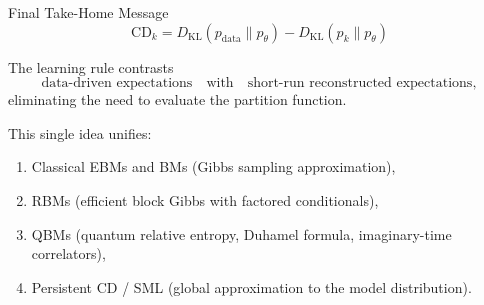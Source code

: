\documentclass[aspectratio=169]{beamer}
\newcommand{\pmodel}{p_{\theta}}
\newcommand{\DKL}{D_{\mathrm{KL}}}
\begin{document}
\begin{frame}{Final Take-Home Message}
\[
  \boxed{
    \mathrm{CD}_k
    = \DKL(p_{\mathrm{data}}\|\pmodel)
      - \DKL(p_k\|\pmodel)
  }
\]

The learning rule contrasts
\[
  \text{data-driven expectations}
  \quad\text{with}\quad
  \text{short-run reconstructed expectations},
\]
eliminating the need to evaluate the partition function.

\medskip
This single idea unifies:
\begin{enumerate}
  \item Classical EBMs and BMs (Gibbs sampling approximation),
  \item RBMs (efficient block Gibbs with factored conditionals),
  \item QBMs (quantum relative entropy, Duhamel formula, imaginary-time correlators),
  \item Persistent CD / SML (global approximation to the model distribution).
\end{enumerate}
\end{frame}
\end{document}
